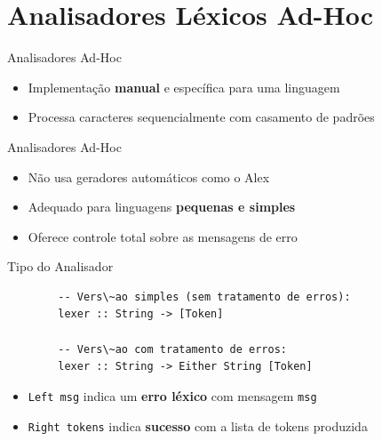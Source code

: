 \section{Analisadores Léxicos
Ad-Hoc}\label{analisadores-luxe9xicos-ad-hoc}

\begin{frame}{Analisadores Ad-Hoc}

    \begin{itemize}

        \item
        Implementação \textbf{manual} e específica para uma linguagem
        \item
        Processa caracteres sequencialmente com casamento de padrões
    \end{itemize}
\end{frame}

\begin{frame}{Analisadores Ad-Hoc}

    \begin{itemize}

        \item
        Não usa geradores automáticos como o Alex
        \item
        Adequado para linguagens \textbf{pequenas e simples}
        \item
        Oferece controle total sobre as mensagens de erro
    \end{itemize}
\end{frame}

\begin{frame}[fragile]{Tipo do Analisador}

    \begin{lstlisting}
        -- Vers\~ao simples (sem tratamento de erros):
        lexer :: String -> [Token]

        -- Vers\~ao com tratamento de erros:
        lexer :: String -> Either String [Token]
    \end{lstlisting}

    \begin{itemize}

        \item
        \texttt{Left msg} indica um \textbf{erro léxico} com
        mensagem \texttt{msg}
        \item
        \texttt{Right tokens} indica \textbf{sucesso} com a
        lista de tokens produzida
    \end{itemize}
\end{frame}

